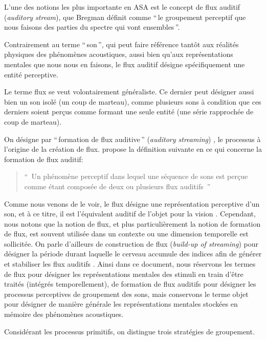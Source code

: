 L'une des notions les plus importante en ASA est le concept de flux auditif (\emph{auditory stream}), que Bregman définit comme ``\,le groupement perceptif que nous faisons des parties du spectre qui vont ensembles\,''.

Contrairement au terme ``\,son\,'', qui peut faire référence tantôt aux réalités physiques des phénomènes acoustiques, aussi bien qu'aux représentations mentales que nous nous en faisons, le flux auditif désigne spécifiquement une entité perceptive.

Le terme flux se veut volontairement généraliste. Ce dernier peut désigner aussi bien un son isolé (un coup de marteau), comme plusieurs sons à condition que ces derniers soient perçus comme formant une seule entité (une série rapprochée de coup de marteau).

On désigne par ``\,formation de flux auditive\,'' (\emph{auditory streaming}) , le processus à l'origine de la création de flux. \citep{winkler2009modeling} propose la définition suivante en ce qui concerne la formation de flux auditif:

\begin{quote}
``\, Un phénomène perceptif dans lequel une séquence de sons est perçue comme étant composée de deux ou plusieurs flux auditifs \,''
\end{quote}

Comme nous venons de le voir, le flux désigne une représentation perceptive d'un son, et à ce titre, il est l'équivalent auditif de l'objet pour la vision \citep[p. 11]{bregman1994auditory}. Cependant, nous notons que la notion de flux, et plus particulièrement la notion de formation de flux, est souvent utilisée dans un contexte ou une dimension temporelle est sollicitée. On parle d'ailleurs de construction de flux  (\emph{build-up of streaming}) pour désigner la période durant laquelle le cerveau accumule des indices afin de générer et stabiliser les flux auditifs  \citep{cusack2004effects,snyder2007toward}. Ainsi dans ce document, nous réservons les termes de flux pour désigner les représentations mentales des stimuli en train d'être traités (intégrés temporellement), de formation de flux auditifs pour désigner les processus perceptives de groupement des sons, mais conservons le terme objet pour désigner de manière générale les représentations mentales stockées en mémoire des phénomènes acoustiques.

Considérant les processus primitifs, on distingue trois stratégies de groupement.

